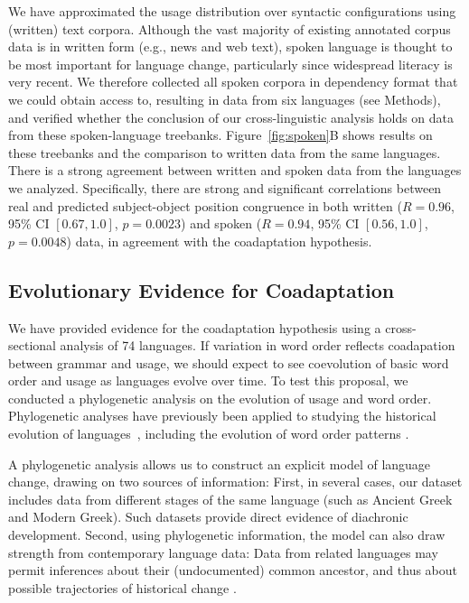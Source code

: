 \documentclass[11pt,a4paper]{article}
\begin{document}
We have approximated the usage distribution over syntactic configurations using (written) text corpora.
Although the vast majority of existing annotated corpus data is in written form (e.g., news and web text), spoken language is thought to be most important for language change, particularly since widespread literacy is very recent.
We therefore collected all spoken corpora in dependency format that we could obtain access to, resulting in data from six languages (see Methods), and verified whether the conclusion of our cross-linguistic analysis holds on data from these spoken-language treebanks. Figure~\ref{fig:spoken}B
shows results on these treebanks and the comparison to written data from the same languages.
There is a strong agreement between written and spoken data from the languages we analyzed. Specifically, there are strong and significant correlations between real and predicted subject-object position congruence in both written ($R=0.96$, 95\% CI $[0.67, 1.0]$, $p=0.0023$) and spoken ($R=0.94$, 95\% CI $[0.56, 1.0]$, $p=0.0048$) data, in agreement with the coadaptation hypothesis. %


\subsection*{Evolutionary Evidence for Coadaptation}
We have provided evidence for the coadaptation hypothesis using a cross-sectional analysis of 74 languages. %
If variation in word order reflects coadapation between grammar and usage, we should expect to see coevolution of basic word order and usage as languages evolve over time.
To test this proposal, we conducted a phylogenetic analysis on the evolution of usage and word order.
Phylogenetic analyses have previously been applied to studying the historical evolution of languages~\citep[e.g., ][]{gray2009language,greenhill2009austronesian,chang2015ancestry,sagart2019dated}, including the evolution of word order patterns \citep{dunn-evolved-2011, maurits2014tracing}.


A phylogenetic analysis allows us to construct an explicit model of language change, drawing on two sources of information:
First, in several cases, our dataset includes data from different stages of the same language (such as Ancient Greek and Modern Greek).
Such datasets provide direct evidence of diachronic development.
Second, using phylogenetic information, the model can also draw strength from contemporary language data:
Data from related languages may permit inferences about their (undocumented) common ancestor, and thus about possible trajectories of historical change \citep{pagel2004bayesian, dunn-evolved-2011, maurits2014tracing}.
\end{document}

